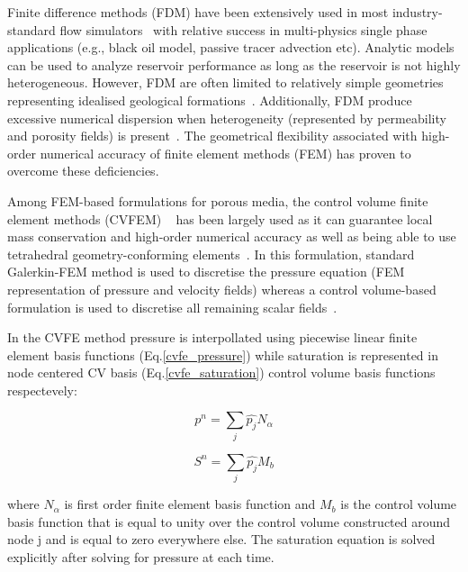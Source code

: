 \documentclass[preprint,authoryear,12pt]{elsarticle}
\begin{document}
Finite difference methods (FDM) have been extensively used in most industry-standard flow simulators~\citep{aziz_1986, chen_2005, chang_1990} with relative success in multi-physics single phase applications (e.g., black oil model, passive tracer advection etc). Analytic models can be used to analyze reservoir performance as long as the reservoir is not highly heterogeneous. However, FDM are often limited to relatively simple geometries 
representing idealised geological formations~\citep{mlacnik_2004, king_1999}. Additionally, FDM produce excessive numerical dispersion when heterogeneity (represented by permeability and porosity fields) is present~\citep{chavent_1986}. The geometrical flexibility associated with high-order numerical accuracy of finite element methods (FEM) has proven to overcome these deficiencies. 

Among FEM-based formulations for porous media, the control volume finite element methods (CVFEM) ~\citep[CVFEM,][]{fung_1992,cordazzo_2004} has been largely used as it can guarantee local mass conservation and high-order numerical accuracy as well as being able to use tetrahedral geometry-conforming elements~\citep{forsyth_1990, geiger_2004, hurtado_2007}. In this formulation, standard Galerkin-FEM method is used to discretise the pressure equation (FEM representation of pressure and velocity fields) whereas a control volume-based formulation is used to discretise all remaining scalar fields~\citep[e.g., saturation, density, species concentration etc, see][]{gomes_book_2012}. 

In the CVFE method pressure is interpollated using piecewise linear finite element basis functions (Eq.\ref{cvfe_pressure}) while saturation is represented in node centered CV basis (Eq.\ref{cvfe_saturation}) control volume basis functions respectevely:

\begin{equation}
 p^{n} = \sum_{j} \hat{p_{j}} N_{\alpha} 
\label{cvfe_pressure}
\end{equation}

\begin{equation}
 S^{n} = \sum_{j} \hat{p_{j}} M_{b} 
\label{cvfe_saturation}
\end{equation}

where $N_{\alpha}$ is first order finite element basis function and $M_{b}$ is the control volume basis function that is equal to unity over the control volume constructed around node j and is equal to zero everywhere else. The saturation equation is solved explicitly after solving for pressure at each time.
\end{document}
